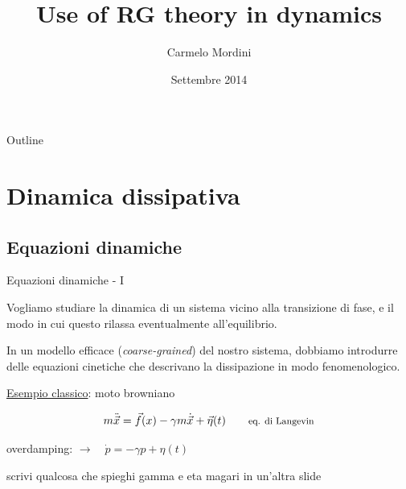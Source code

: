 \documentclass[10pt]{beamer}
\title{Use of RG theory in dynamics}
\author[Carmelo Mordini]{Carmelo Mordini}
\date{\small{Settembre 2014}}
\begin{document}

\begin{frame}[plain]
\advance\textwidth2cm
\hsize\textwidth
\columnwidth\textwidth
  \titlepage
\end{frame}


\begin{frame}{Outline}
\transwipe[direction=270]
  \tableofcontents%
\end{frame}

\section{Dinamica dissipativa}
\subsection{Equazioni dinamiche}

\begin{frame}{Equazioni dinamiche - I}

Vogliamo studiare la dinamica di un sistema vicino alla transizione di fase, e il modo in cui questo rilassa eventualmente all'equilibrio.

In un modello efficace (\emph{coarse-grained}) del nostro sistema, dobbiamo introdurre delle equazioni cinetiche che descrivano la dissipazione in modo fenomenologico.
\pause
\vskip10pt

\underline{Esempio classico}: moto browniano

\begin{equation*}
 m\ddot{\vec x} = \vec f(x) - \gamma m \dot{\vec x} + \vec \eta(t) \qquad \text{\footnotesize eq. di Langevin}
\end{equation*}

\vskip10pt
overdamping: $\rightarrow \quad \dot p  = -\gamma p + \eta(t)$

scrivi qualcosa che spieghi gamma e eta
magari in un'altra slide
\end{frame}
\end{document}

